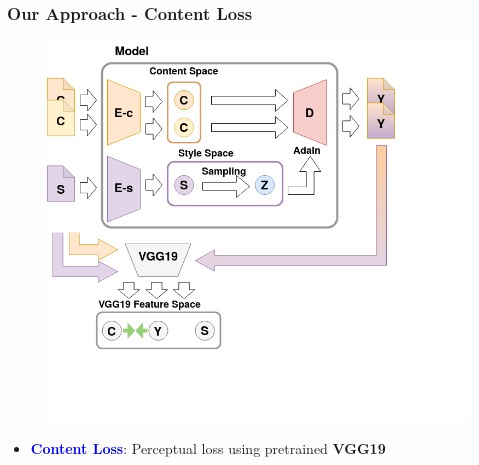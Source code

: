 \documentclass[11pt,xcolor=dvipsnames]{beamer}
\begin{document}
\begin{frame}
  \addtocounter{framenumber}{-1}
\frametitle{Our Approach - Content Loss}
\begin{figure}
\centering
\includegraphics[scale=0.3]{pipelinecontent.png}
\end{figure}


\begin{itemize}
	\item \textcolor{blue}{\textbf{Content Loss}}: Perceptual loss using pretrained \textbf{VGG19}
	\vspace{10pt}
\end{itemize}

\end{frame}
\end{document}
